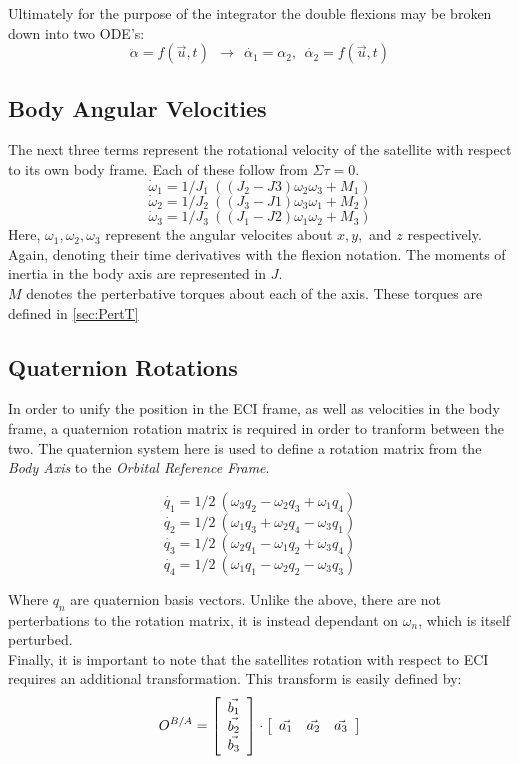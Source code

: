 \documentclass[12pt,a4paper]{article}
\begin{document}
Ultimately for the purpose of the integrator the double flexions may be broken down into two ODE's:
\[\ddot{\alpha}=f(\vec{u},t)~~ \rightarrow ~~ \dot{\alpha_{1}}= \alpha_{2},~~ \dot{\alpha_{2}}=f(\vec{u},t)\]

\subsection{Body Angular Velocities}
The next three terms represent the rotational velocity of the satellite with respect to its own body frame. Each of these follow from $\Sigma \tau = 0$.
\[\dot{\omega}_{1}=1/J_{1} ~((J_{2}-J{3})\omega_{2}\omega_{3}+M_{1})\]
\[\dot{\omega}_{2}=1/J_{2} ~((J_{3}-J{1})\omega_{3}\omega_{1}+M_{2})\]
\[\dot{\omega}_{3}=1/J_{3} ~((J_{1}-J{2})\omega_{1}\omega_{2}+M_{3})\]
Here, $\omega_{1},\omega_{2},\omega_{3}$ represent the angular velocites about $x,y,$ and $z$ respectively. Again, denoting their time derivatives with the flexion notation. The moments of inertia in the body axis are represented in $J$.\\

$M$ denotes the perterbative torques about each of the axis. These torques are defined in \ref{sec:PertT}

\subsection{Quaternion Rotations}
In order to unify the position in the ECI frame, as well as velocities in the body frame, a quaternion rotation matrix is required in order to tranform between the two. The quaternion system here is used to define a rotation matrix from the \emph{Body Axis} to the \emph{Orbital Reference Frame}.

\[\dot{q_{1}}=1/2 ~(\omega_{3}q_{2}-\omega_{2}q_{3}+\omega_{1}q_{4})\]
\[\dot{q_{2}}=1/2 ~(\omega_{1}q_{3}+\omega_{2}q_{4}-\omega_{3}q_{1})\]
\[\dot{q_{3}}=1/2 ~(\omega_{2}q_{1}-\omega_{1}q_{2}+\omega_{3}q_{4})\]
\[\dot{q_{4}}=1/2 ~(\omega_{1}q_{1}-\omega_{2}q_{2}-\omega_{3}q_{3})\]

Where $q_{n}$ are quaternion basis vectors. Unlike the above, there are not perterbations to the rotation matrix, it is instead dependant on $\omega_{n}$, which is itself perturbed.\\

Finally, it is important to note that the satellites rotation with respect to ECI requires an additional transformation. This transform is easily defined by:
\[ O^{B/A}= \left[\begin{array}{c} \vec{b_{1}}\\ \vec{b_{2}}\\ \vec{b_{3}}\\ \end{array}\right] \cdot \left[\begin{array}{c c c} \vec{a_{1}} & \vec{a_{2}} & \vec{a_{3}} \end{array}\right]  \]
\end{document}
